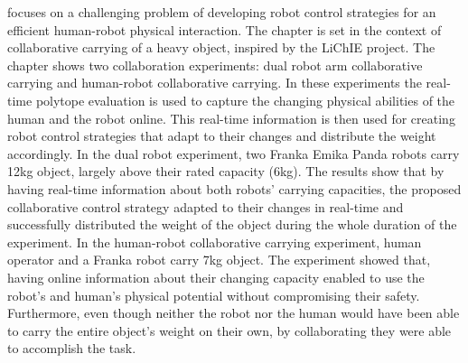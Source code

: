  focuses on a challenging problem of developing robot control strategies for an efficient human-robot physical interaction. The chapter is set in the context of collaborative carrying of a heavy object, inspired by the LiChIE project. 
The chapter shows two collaboration experiments: dual robot arm collaborative carrying and human-robot collaborative carrying. In these experiments the real-time polytope evaluation is used to capture the changing physical abilities of the human and the robot online. This real-time information is then used for creating robot control strategies that adapt to their changes and distribute the weight accordingly. In the dual robot experiment, two Franka Emika Panda robots carry 12kg object, largely above their rated capacity (6kg). The results show that by having real-time information about both robots' carrying capacities, the proposed collaborative control strategy adapted to their changes in real-time and successfully distributed the weight of the object during the whole duration of the experiment. In the human-robot collaborative carrying experiment, human operator and a Franka robot carry 7kg object. The experiment showed that, having online information about their changing capacity enabled to use the robot's and human's physical potential without compromising their safety. Furthermore, even though neither the robot nor the human would have been able to carry the entire object's weight on their own, by collaborating they were able to accomplish the task.
 
